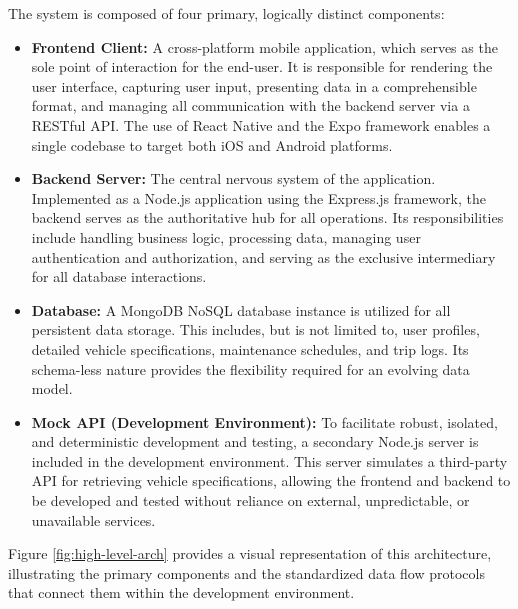 \textgap

The system is composed of four primary, logically distinct components:
\begin{itemize}
    \item \textbf{Frontend Client:} A cross-platform mobile application, which serves as the sole point of interaction for the end-user. It is responsible for rendering the user interface, capturing user input, presenting data in a comprehensible format, and managing all communication with the backend server via a RESTful API. The use of React Native and the Expo framework enables a single codebase to target both iOS and Android platforms.
    
    \textgap

    \item \textbf{Backend Server:} The central nervous system of the application. Implemented as a Node.js application using the Express.js framework, the backend serves as the authoritative hub for all operations. Its responsibilities include handling business logic, processing data, managing user authentication and authorization, and serving as the exclusive intermediary for all database interactions.
    
    \textgap

    \item \textbf{Database:} A MongoDB NoSQL database instance is utilized for all persistent data storage. This includes, but is not limited to, user profiles, detailed vehicle specifications, maintenance schedules, and trip logs. Its schema-less nature provides the flexibility required for an evolving data model.
    
    \textgap

    \item \textbf{Mock API (Development Environment):} To facilitate robust, isolated, and deterministic development and testing, a secondary Node.js server is included in the development environment. This server simulates a third-party API for retrieving vehicle specifications, allowing the frontend and backend to be developed and tested without reliance on external, unpredictable, or unavailable services.
\end{itemize}

\textgap

Figure \ref{fig:high-level-arch} provides a visual representation of this architecture, illustrating the primary components and the standardized data flow protocols that connect them within the development environment.


